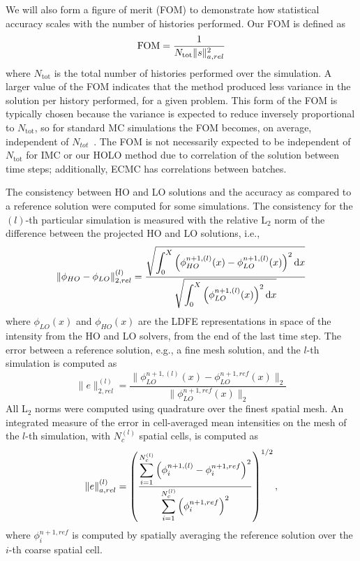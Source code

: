 We will also form a figure of merit (FOM) to demonstrate how statistical accuracy
scales with the number of histories performed.  Our FOM is defined as
\begin{equation}\label{eq:fom}
    \text{FOM} = \frac{1}{N_{\text{tot}}\|s\|_{a,rel}^2}
\end{equation}
where $N_{\text{tot}}$ is the total number of histories performed over the simulation.
A larger value of the FOM indicates that the method produced less variance in the
solution per history performed, for a given problem.  This form of the FOM
is typically chosen because the variance is expected to reduce inversely proportional
to $N_{\text{tot}}$, so for standard MC simulations the FOM becomes, on average, independent of
$N_{tot}$~\cite{shultis_mc}.  The FOM is not necessarily expected to be independent
of $N_{\text{tot}}$ for IMC or
our HOLO method due to correlation of the solution between time steps; additionally, ECMC
has correlations between batches.

The consistency between HO and LO solutions and the accuracy as 
compared to a reference solution were computed for some simulations.
The consistency for the $(l)$-th particular simulation is measured with the relative L$_2$ norm
of the difference between the projected HO and LO solutions, i.e.,
\begin{equation}
    \|\phi_{HO} - \phi_{LO}\|^{(l)}_{2,rel} = \frac{\displaystyle \sqrt{\int_0^X \left(
        \phi_{HO}^{n+1,(l)}(x) - \phi_{LO}^{n+1,(l)}(x) \right)^2 \mathrm{d} x}}{\displaystyle \sqrt{
            \int_0^X \left(\phi_{LO}^{n+1,(l)}(x)\right)^2 \mathrm{d} x }}
\end{equation}
where $\phi_{LO}(x)$ and $\phi_{HO}(x)$ are the LDFE representations in space of the
intensity from the HO and LO solvers, from the end of the last time step.
The error between a reference solution, e.g., a fine mesh solution, and the $l$-th simulation
is computed as
\begin{equation}
    \|e\|^{{(l)}}_{2,rel} = \frac{\|\phi_{LO}^{n+1,{(l)}}(x) -
    \phi_{LO}^{n+1,ref}\left( x \right)\|_2}{\|\phi_{LO}^{n+1,ref}\left( x \right)\|_2}
\end{equation}
All L$_2$ norms were computed using quadrature over the finest spatial mesh.  An
integrated measure of the error in cell-averaged mean intensities on the mesh of the
$l$-th simulation, with $N_c^{(l)}$ spatial cells, is computed as
\begin{equation}
    \|e\|^{{(l)}}_{a,rel} = \left({\frac{\displaystyle \sum\limits_{i=1}^{N^{(l)}_c}
    \left(\phi_i^{n+1,{(l)}} - \phi_i^{n+1,ref}
\right)^2}{\displaystyle \sum\limits_{i=1}^{N^{(l)}_c}\left(\phi_i^{n+1,ref}\right)^2}}\right)^{1/2},
\end{equation}
where $\phi_i^{n+1,ref}$ is computed by spatially averaging the reference solution over
the $i$-th coarse spatial cell.

